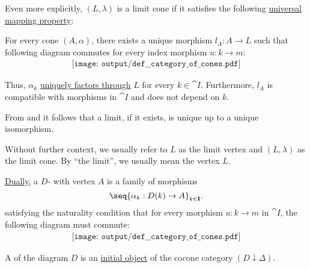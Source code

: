 \begin{definition}
\begin{thmenum}
    Even more explicitly, \( (L, \lambda) \) is a limit cone if it satisfies the following \hyperref[rem:limit_universal_mapping_property]{universal mapping property}:
    \begin{displayquote}
      For every cone \( (A, \alpha) \), there exists a unique morphism \( l_A: A \to L \) such that following diagram commutes for every index morphism \( u: k \to m \):
      \begin{equation}\label{eq:def:category_of_cones/limit}
        \begin{aligned}
          \texttt{[image: output/def\_\_category\_of\_cones.pdf]}
        \end{aligned}
      \end{equation}
    \end{displayquote}

    Thus, \( \alpha_k \) \hyperref[def:factors_through]{uniquely factors through} \( L \) for every \( k \in \cat{I} \). Furthermore, \( l_A \) is compatible with morphisms in \( \cat{I} \) and does not depend on \( k \).

    From  and  it follows that a limit, if it exists, is unique up to a unique isomorphism.

    Without further context, we usually refer to \( L \) as the limit vertex and \( (L, \lambda) \) as the limit cone. By \enquote{the limit}, we usually mean the vertex \( L \).

     \hyperref[thm:categorical_principle_of_duality]{Dually}, a \( D \)- with vertex \( A \) is a family of morphisms
    \begin{equation}\label{eq:def:category_of_cones/cocone}
      \seq{ \alpha_k: D(k) \to A }_{k \in \cat{I}}.
    \end{equation}
    satisfying the naturality condition that for every morphism \( u: k \to m \) in \( \cat{I} \), the following diagram must commute:
    \begin{equation}\label{eq:def:category_of_cones/cocone_nat}
      \begin{aligned}
        \texttt{[image: output/def\_\_category\_of\_cones.pdf]}
      \end{aligned}
    \end{equation}

     A  of the diagram \( D \) is an \hyperref[def:universal_objects/initial]{initial object} of the cocone category \( (D \downarrow \Delta) \).


\end{thmenum}
\end{definition}
